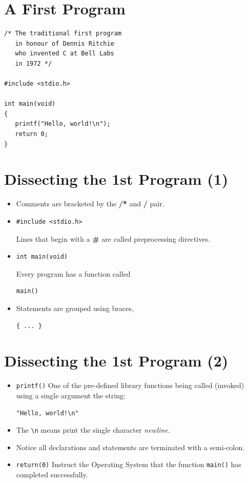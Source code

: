 \documentclass[a4,portraitt]{slides}
\begin{document}
\newpage
\section*{A First Program}

\begin{verbatim}
/* The traditional first program
   in honour of Dennis Ritchie
   who invented C at Bell Labs
   in 1972 */

#include <stdio.h>

int main(void)
{
   printf("Hello, world!\n");
   return 0;
}
\end{verbatim}

\newpage
\section*{Dissecting the 1st Program (1)}

\begin{itemize}
\item Comments are bracketed by the {\bf /*} and {\bf */} pair.
\item
\begin{verbatim}
#include <stdio.h>
\end{verbatim}
Lines that begin with a {\bf \#}
are called preprocessing directives.
\item \begin{verbatim}
int main(void)
\end{verbatim}
Every program has a function called \begin{verbatim}
main()
\end{verbatim}

\item Statements are grouped using braces,
\begin{verbatim}
{ ... }
\end{verbatim}
\end{itemize}

\section*{Dissecting the 1st Program (2)}

\begin{itemize}
\item \verb+printf()+ One of the pre-defined library functions being called (invoked) using a single argument the string:
\begin{verbatim}
"Hello, world!\n"
\end{verbatim}
\item The \verb+\n+ means print the single character {\it newline}.
\item Notice all declarations and statements are terminated with a
semi-colon.
\item \verb+return(0)+
Instruct the Operating System that the function
\verb+main()+ has completed successfully.
\end{itemize}
\end{document}
